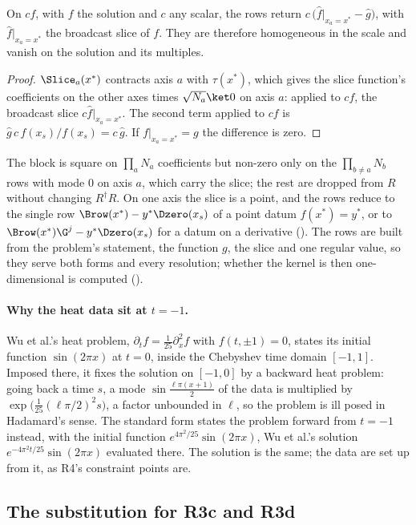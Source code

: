 \begin{proposition}
\label{prop:datum-slice}
On $cf$, with $f$ the solution and $c$ any scalar, the rows return $c\,\bigl(\hat f|_{x_a=x^*}-\hat g\bigr)$, with $\hat f|_{x_a=x^*}$ the broadcast slice of $f$. They are therefore homogeneous in the scale and vanish on the solution and its multiples.
\end{proposition}
\begin{proof}
$\Slice_a(x^*)$ contracts axis $a$ with $\tau(x^*)$, which gives the slice function's coefficients on the other axes times $\sqrt{N_a}\ket0$ on axis $a$: applied to $cf$, the broadcast slice $c\hat f|_{x_a=x^*}$. The second term applied to $cf$ is $\hat g\,c\,f(x_s)/f(x_s)=c\,\hat g$. If $f|_{x_a=x^*}=g$ the difference is zero.
\end{proof}

The block is square on $\prod_aN_a$ coefficients but non-zero only on the $\prod_{b\ne a}N_b$ rows with mode $0$ on axis $a$, which carry the slice; the rest are dropped from $R$ without changing $R^\dagger R$. On one axis the slice is a point, and the rows reduce to the single row $\Brow(x^*)-y^*\Dzero(x_s)$ of a point datum $f(x^*)=y^*$, or to $\Brow(x^*)\G^j-y^*\Dzero(x_s)$ for a datum on a derivative (). The rows are built from the problem's statement, the function $g$, the slice and one regular value, so they serve both forms and every resolution; whether the kernel is then one-dimensional is computed ().

\paragraph{Why the heat data sit at $t=-1$.} Wu et al.'s heat problem, $\partial_tf=\tfrac1{25}\partial_x^2f$ with $f(t,\pm1)=0$, states its initial function $\sin(2\pi x)$ at $t=0$, inside the Chebyshev time domain $[-1,1]$. Imposed there, it fixes the solution on $[-1,0]$ by a backward heat problem: going back a time $s$, a mode $\sin\tfrac{\ell\pi(x+1)}{2}$ of the data is multiplied by $\exp\bigl(\tfrac{1}{25}(\ell\pi/2)^2s\bigr)$, a factor unbounded in $\ell$, so the problem is ill posed in Hadamard's sense. The standard form states the problem forward from $t=-1$ instead, with the initial function $e^{4\pi^2/25}\sin(2\pi x)$, Wu et al.'s solution $e^{-4\pi^2t/25}\sin(2\pi x)$ evaluated there. The solution is the same; the data are set up from it, as R4's constraint points are.

\subsection{The substitution for R3c and R3d}
\label{app:legendre-substitution}

